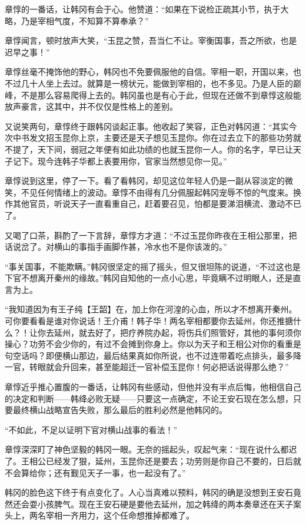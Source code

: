 章惇的一番话，让韩冈有会于心。他赞道：“如果在下说检正疏其小节，执于大略，乃是宰相气度，不知算不算奉承？”

章惇闻言，顿时放声大笑，“玉昆之赞，吾当仁不让。宰衡国事，吾之所欲，也是迟早之事！”

章惇丝毫不掩饰他的野心，韩冈也不免要佩服他的自信。宰相一职，开国以来，也不过几十人坐上去过。就算是一榜状元，能做到宰相的，也不多见。乃是人臣的巅峰，不是那么容易爬得上去的。韩冈虽也是有心于此，但现在还做不到章惇这般能放声豪言，这其中，并不仅仅是性格上的差别。

又说笑两句，章惇终于跟韩冈谈起正事。他收起了笑容，正色对韩冈道：“其实今次中书发文招玉昆你上京，主要还是天子想见玉昆你。你在过去立下的那些功劳就不提了，天下间，弱冠之年便有如此功绩的也就玉昆你一人。你的名字，早已让天子记下。现今连韩子华都上表要用你，官家当然想见你一见。”

章惇说到这里，停了一下。看了看韩冈，却见这位年轻人仍是一副从容淡定的微笑，不见任何情绪上的波动。章惇不由得有几分佩服起韩冈宠辱不惊的气度来。换作其他官员，听说天子一直看重自己，赶着要召见，怕都是要涕泪横流、激动不已了。

又喝了口茶，斟酌了一下言辞，章惇方才道：“不过玉昆你昨夜在王相公那里，把话说岔了。对横山的事指手画脚作甚，冷水也不是你该泼的。”

“事关国事，不能欺瞒。”韩冈很坚定的摇了摇头，但又很坦陈的说道，“不过这也是下官不想离开秦州的缘故。”韩冈自知他的一点小心思，毕竟瞒不过明眼人，还是直言为上。

“我知道因为有王子纯【王韶】在，加上你在河湟的心血，所以才不想离开秦州。可你要看看是谁对你说话！王介甫！韩子华！两名宰相都要你去延州，你还推搪什么？！让你去延州，就去好了，把疗养院办起，将伤兵们照管好，其他的事何须你操心？功劳不会少你的，有过不会摊到你身上。你以为天子和王相公对你的看重是句空话吗？即便横山那边，最后结果真如你所说，也不过连带着吃点排头，最多降一官，转眼就会升回来，甚至能超迁一官补偿玉昆你！何必把话说得那么绝？”

章惇近乎推心置腹的一番话，让韩冈有些感动，但他并没有半点后悔，他相信自己的决定和判断——韩绛必败无疑——只要这一点确定，不论王安石现在怎么想，只要最终横山战略宣告失败，那么最后的胜利必然是他韩冈的。

“不如此，不足以证明下官对横山战事的看法！”

章惇深深盯了神色坚毅的韩冈一眼。无奈的摇起头，叹起气来：“现在说什么都迟了。王相公已经发了狠，延州，玉昆你还是要去；功劳则是你自己不要的，日后就不会算给你；还有觐见天子一事，也一起没有了。”

韩冈的脸色这下终于有点变化了。人心当真难以预料，韩冈的确是没想到王安石竟然还会耍小孩脾气。现在王安石硬是要他去延州，加之韩绛的两本奏章还在天子案头上，两名宰相一齐用力，这个任命想推掉都难了。

